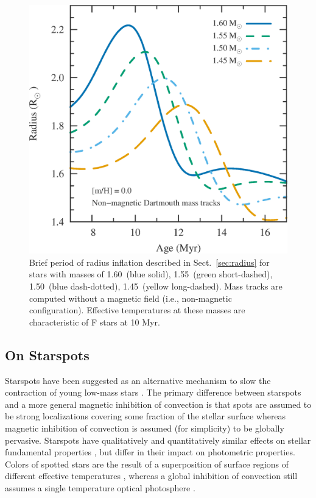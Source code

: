 \documentclass{aa}
\begin{document}
\begin{figure}
    \centering
    \includegraphics[width=0.85\linewidth]{radius_bump.eps}
    \caption{Brief period of radius inflation described in Sect.~\ref{sec:radius} for stars with masses of 1.60\msun\ (blue solid), 1.55\msun\ (green short-dashed), 1.50\msun\ (blue dash-dotted), 1.45\msun\ (yellow long-dashed). Mass tracks are computed without a magnetic field (i.e., non-magnetic configuration). Effective temperatures at these masses are characteristic of F stars at 10 Myr.}
    \label{fig:bump}
\end{figure}

\subsection{On Starspots}
Starspots have been suggested as an alternative mechanism to slow the contraction of young low-mass stars \citep{Jackson2009, MM10, Jackson2014a, Somers2015b}. The primary difference between starspots and a more general magnetic inhibition of convection is that spots are assumed to be strong localizations covering some fraction of the stellar surface whereas magnetic inhibition of convection is assumed (for simplicity) to be globally pervasive. Starspots have qualitatively and quantitatively similar effects on stellar fundamental properties \citep[radius, \teff, luminosity;][]{Spruit1982a,Spruit1986,Somers2015b}, but differ in their impact on photometric properties. Colors of spotted stars are the result of a superposition of surface regions of different effective temperatures \citep{Spruit1986}, whereas a global inhibition of convection still assumes a single temperature optical photosphere \citep{Jackson2014a}.
\end{document}
